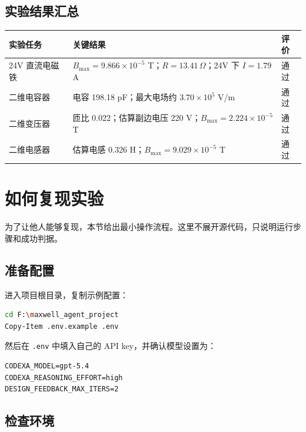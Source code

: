 \documentclass[12pt,a4paper]{ctexart}
\begin{document}
\subsection{实验结果汇总}

\begin{table}[h]
\centering
\begin{tabularx}{\textwidth}{>{\raggedright\arraybackslash}p{3.0cm}X>{\raggedright\arraybackslash}p{2.3cm}}
\toprule
实验任务 & 关键结果 & 评价 \\
\midrule
24V 直流电磁铁 & $B_{\max}=9.866\times10^{-5}$ T；$R=13.41\,\Omega$；24V 下 $I=1.79$ A & 通过 \\
二维电容器 & 电容 198.18 pF；最大电场约 $3.70\times10^{5}$ V/m & 通过 \\
二维变压器 & 匝比 0.022；估算副边电压 220 V；$B_{\max}=2.224\times10^{-5}$ T & 通过 \\
二维电感器 & 估算电感 0.326 H；$B_{\max}=9.029\times10^{-5}$ T & 通过 \\
\bottomrule
\end{tabularx}
\end{table}

\section{如何复现实验}

为了让他人能够复现，本节给出最小操作流程。这里不展开源代码，只说明运行步骤和成功判据。

\subsection{准备配置}

进入项目根目录，复制示例配置：

\begin{lstlisting}[language=bash]
cd F:\maxwell_agent_project
Copy-Item .env.example .env
\end{lstlisting}

然后在 \texttt{.env} 中填入自己的 API key，并确认模型设置为：

\begin{lstlisting}[language={}]
CODEXA_MODEL=gpt-5.4
CODEXA_REASONING_EFFORT=high
DESIGN_FEEDBACK_MAX_ITERS=2
\end{lstlisting}

\subsection{检查环境}
\end{document}
